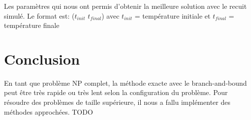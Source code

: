 \documentclass[12pt,letterpaper,twoside]{article}
\begin{document}
			\begin{table}[H]
				\centering
				
				\caption{Les paramètres qui nous ont permis d'obtenir la meilleure solution avec le recuit simulé.
					Le format est: (\(t_{init}\) \(t_{final}\)) avec \(t_{init}\) = température initiale et
					\(t_{final}\) = température finale}
				\label{table:annealing-parameters}
			\end{table}
	\section{Conclusion}
		\paragraph*{}
			En tant que problème NP complet, la méthode exacte avec le branch-and-bound peut être très rapide ou très lent selon la configuration du problème.
			Pour résoudre des problèmes de taille supérieure, il nous a fallu implémenter des méthodes approchées.
			TODO
	\newpage\printbibliography[heading=bibintoc]{}
\end{document}
